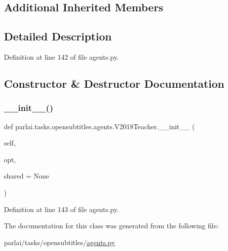 \subsection*{Additional Inherited Members}


\subsection{Detailed Description}


Definition at line 142 of file agents.\+py.



\subsection{Constructor \& Destructor Documentation}
\mbox{\label{classparlai_1_1tasks_1_1opensubtitles_1_1agents_1_1V2018Teacher_a10803c76b3b6467a673659099d90d777}} 
\subsubsection{\texorpdfstring{\+\_\+\+\_\+init\+\_\+\+\_\+()}{\_\_init\_\_()}}
{\footnotesize\ttfamily def parlai.\+tasks.\+opensubtitles.\+agents.\+V2018\+Teacher.\+\_\+\+\_\+init\+\_\+\+\_\+ (\begin{DoxyParamCaption}\item[{}]{self,  }\item[{}]{opt,  }\item[{}]{shared = {\ttfamily None} }\end{DoxyParamCaption})}



Definition at line 143 of file agents.\+py.



The documentation for this class was generated from the following file\+:\begin{DoxyCompactItemize}
\item 
parlai/tasks/opensubtitles/\hyperlink{parlai_2tasks_2opensubtitles_2agents_8py}{agents.\+py}\end{DoxyCompactItemize}
